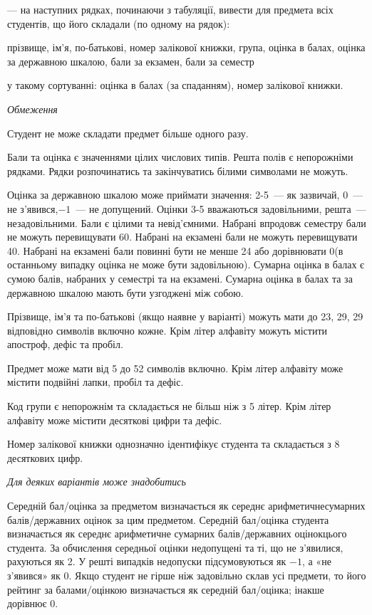 \documentclass[11pt, ukrainian]{article}
\begin{document}
{\noindent}--- на наступних рядках, починаючи з табуляції, вивести для предмета всіх студентів, що його складали (по одному на рядок):\par
прізвище, ім’я, по-батькові, номер залікової книжки, група, оцінка в балах, оцінка за державною шкалою, бали за екзамен, бали за семестр

{\noindent}у такому сортуванні: оцінка в балах (за спаданням), номер залікової книжки.


\bigskip\textit{Обмеження}

Студент не може складати предмет більше одного разу.

Бали та оцінка є значеннями цілих числових типів. Решта полів є непорожніми рядками.
Рядки розпочинатись та закінчуватись білими символами не можуть.

Оцінка за державною шкалою може приймати значення: 2-5~--- як зазвичай, 0~--- не з’явився,$-1$~--- не допущений. 
Оцінки 3-5 вважаються задовільними, решта~--- незадовільними. 
Бали є цілими та невід’ємними.
Набрані впродовж семестру бали не можуть перевищувати 60. 
Набрані на екзамені бали не можуть перевищувати 40. 
Набрані на екзамені бали повинні бути не менше 24 або дорівнювати 0(в останньому випадку оцінка не може бути задовільною). 
Сумарна оцінка в балах є сумою балів, набраних у семестрі та на екзамені.
Сумарна оцінка в балах та за державною шкалою мають бути узгоджені між собою.

Прізвище, ім’я та по-батькові (якщо наявне у варіанті) можуть мати до 23, 29, 29 відповідно символів включно кожне. 
Крім літер алфавіту можуть містити апостроф, дефіс та пробіл.

Предмет може мати від 5 до 52 символів включно. 
Крім літер алфавіту може містити подвійні лапки, пробіл та дефіс.

Код групи є непорожнім та складається не більш ніж з 5 літер. 
Крім літер алфавіту може містити десяткові цифри та дефіс.


Номер залікової книжки однозначно ідентифікує студента та складається з 8 десяткових цифр. 

\bigskip\textit{Для деяких варіантів може знадобитись}

Середній бал/оцінка за предметом визначається як середнє арифметичнесумарних балів/державних оцінок за цим предметом. 
Середній бал/оцінка студента визначається як середнє арифметичне сумарних балів/державних оцінокцього студента. 
За обчислення середньої оцінки недопущені та ті, що не з’явилися, рахуються як 2.
У решті випадків недопуски підсумовуються як $-1$, а «не з’явився» як 0.
Якщо студент не гірше ніж задовільно склав усі предмети, 
то його рейтинг за балами/оцінкою визначається як середній бал/оцінка; інакше дорівнює 0.
\end{document}
